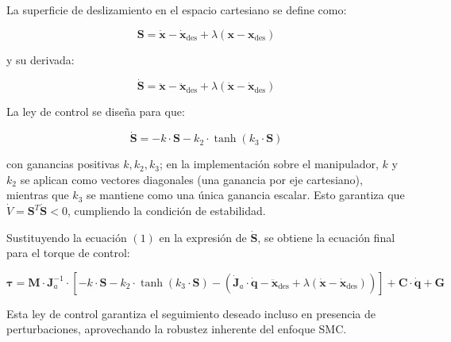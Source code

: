 La superficie de deslizamiento en el espacio cartesiano se define como:

\[
    \boldsymbol{S} = \boldsymbol{\dot{x}} - \boldsymbol{\dot{x}}_{\text{des}} + \lambda (\boldsymbol{x} - \boldsymbol{x}_{\text{des}})
\]

y su derivada:

\[
    \boldsymbol{\dot{S}} = \boldsymbol{\ddot{x}} - \boldsymbol{\ddot{x}}_{\text{des}} + \lambda (\boldsymbol{\dot{x}} -
    \boldsymbol{\dot{x}}_{\text{des}})
\]

La ley de control se diseña para que:

\[
    \boldsymbol{\dot{S}} = -k \cdot \boldsymbol{S} - k_2 \cdot \tanh(k_3 \cdot \boldsymbol{S})
\]

con ganancias positivas \( k, k_2, k_3 \); en la implementación sobre el
manipulador, $k$ y $k_2$ se aplican como vectores diagonales (una ganancia por
eje cartesiano), mientras que $k_3$ se mantiene como una única ganancia
escalar. Esto garantiza que \( \dot{V} = \boldsymbol{S}^T
\boldsymbol{\dot{S}} < 0 \), cumpliendo la condición de estabilidad.

Sustituyendo la ecuación \((1)\) en la expresión de \( \boldsymbol{\dot{S}} \), se obtiene
la ecuación final para el torque de control:

\[
    \boldsymbol{\tau} = \boldsymbol{M} \cdot \boldsymbol{J}_a^{-1} \cdot \left[ -k \cdot \boldsymbol{S} - k_2 \cdot \tanh(k_3 \cdot \boldsymbol{S})
        - \left( \boldsymbol{\dot{J}}_a \cdot \boldsymbol{\dot{q}} - \boldsymbol{\ddot{x}}_{\text{des}} + \lambda (\boldsymbol{\dot{x}} -
        \boldsymbol{\dot{x}}_{\text{des}}) \right) \right] + \boldsymbol{C} \cdot \boldsymbol{\dot{q}} + \boldsymbol{G}
\]

Esta ley de control garantiza el seguimiento deseado incluso en presencia de
perturbaciones, aprovechando la robustez inherente del enfoque SMC.

